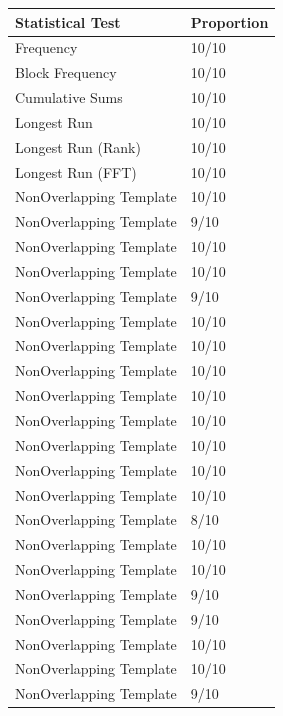\documentclass[letterpaper, 11 pt]{book}
\begin{document}
\begin{table}[H]
    \centering
\begin{tabular}{|l|l|}
\hline
\textbf{Statistical Test}          & \textbf{Proportion} \\\hline
Frequency                 & 10/10      \\\hline
Block Frequency           & 10/10      \\\hline
Cumulative Sums           & 10/10      \\\hline
Longest Run               & 10/10      \\\hline
Longest Run (Rank)        & 10/10      \\\hline
Longest Run (FFT)         & 10/10      \\\hline
NonOverlapping Template   & 10/10      \\\hline
NonOverlapping Template   & 9/10       \\\hline
NonOverlapping Template   & 10/10      \\\hline
NonOverlapping Template   & 10/10      \\\hline
NonOverlapping Template   & 9/10       \\\hline
NonOverlapping Template   & 10/10      \\\hline
NonOverlapping Template   & 10/10      \\\hline
NonOverlapping Template   & 10/10      \\\hline
NonOverlapping Template   & 10/10      \\\hline
NonOverlapping Template   & 10/10      \\\hline
NonOverlapping Template   & 10/10      \\\hline
NonOverlapping Template   & 10/10      \\\hline
NonOverlapping Template   & 10/10      \\\hline
NonOverlapping Template   & 8/10      \\\hline
NonOverlapping Template   & 10/10      \\\hline
NonOverlapping Template   & 10/10      \\\hline
NonOverlapping Template   & 9/10      \\\hline
NonOverlapping Template   & 9/10      \\\hline
NonOverlapping Template   & 10/10      \\\hline
NonOverlapping Template   & 10/10      \\\hline
NonOverlapping Template   & 9/10      \\\hline

\end{tabular}
\end{table}
\end{document}

